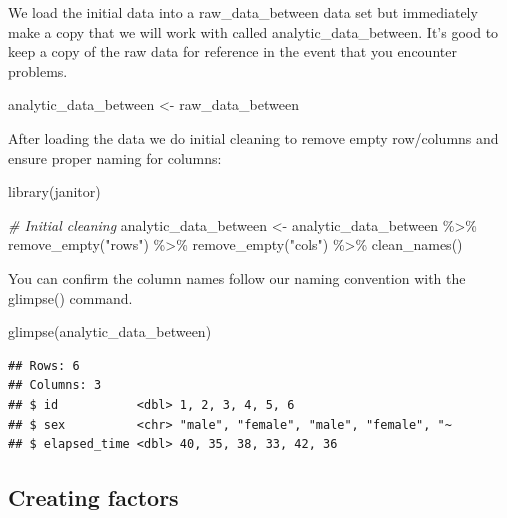 \documentclass[
]{krantz}
\makeatletter
\newenvironment{Shaded}{\begin{snugshade}}{\end{snugshade}}
\newcommand{\CommentTok}[1]{\textcolor[rgb]{0.37,0.37,0.37}{\textit{#1}}}
\newcommand{\FunctionTok}[1]{\textcolor[rgb]{0,0,0}{#1}}
\newcommand{\NormalTok}[1]{#1}
\newcommand{\OtherTok}[1]{\textcolor[rgb]{0.37,0.37,0.37}{#1}}
\newcommand{\SpecialCharTok}[1]{\textcolor[rgb]{0,0,0}{#1}}
\newcommand{\StringTok}[1]{\textcolor[rgb]{0.5,0.5,0.5}{#1}}
\newenvironment{kframe}{%
\medskip{}
\setlength{\fboxsep}{.8em}
 \def\at@end@of@kframe{}%
 \ifinner\ifhmode%
  \def\at@end@of@kframe{\end{minipage}}%
  \begin{minipage}{\columnwidth}%
 \fi\fi%
 \def\FrameCommand##1{\hskip\@totalleftmargin \hskip-\fboxsep
 \colorbox{shadecolor}{##1}\hskip-\fboxsep
     \hskip-\linewidth \hskip-\@totalleftmargin \hskip\columnwidth}%
 \MakeFramed {\advance\hsize-\width
   \@totalleftmargin\z@ \linewidth\hsize
   \@setminipage}}%
 {\par\unskip\endMakeFramed%
 \at@end@of@kframe}
\renewenvironment{Shaded}{\begin{kframe}}{\end{kframe}}
\makeatother
\begin{document}
We load the initial data into a raw\_data\_between data set but immediately make a copy that we will work with called analytic\_data\_between. It's good to keep a copy of the raw data for reference in the event that you encounter problems.

\begin{Shaded}
\begin{Highlighting}[]
\NormalTok{analytic\_data\_between }\OtherTok{\textless{}{-}}\NormalTok{ raw\_data\_between}
\end{Highlighting}
\end{Shaded}

After loading the data we do initial cleaning to remove empty row/columns and ensure proper naming for columns:

\begin{Shaded}
\begin{Highlighting}[]
\FunctionTok{library}\NormalTok{(janitor)}

\CommentTok{\# Initial cleaning}
\NormalTok{analytic\_data\_between }\OtherTok{\textless{}{-}}\NormalTok{ analytic\_data\_between }\SpecialCharTok{\%\textgreater{}\%}
  \FunctionTok{remove\_empty}\NormalTok{(}\StringTok{"rows"}\NormalTok{) }\SpecialCharTok{\%\textgreater{}\%}
  \FunctionTok{remove\_empty}\NormalTok{(}\StringTok{"cols"}\NormalTok{) }\SpecialCharTok{\%\textgreater{}\%}
  \FunctionTok{clean\_names}\NormalTok{()}
\end{Highlighting}
\end{Shaded}

You can confirm the column names follow our naming convention with the glimpse() command.

\begin{Shaded}
\begin{Highlighting}[]
\FunctionTok{glimpse}\NormalTok{(analytic\_data\_between)}
\end{Highlighting}
\end{Shaded}

\begin{verbatim}
## Rows: 6
## Columns: 3
## $ id           <dbl> 1, 2, 3, 4, 5, 6
## $ sex          <chr> "male", "female", "male", "female", "~
## $ elapsed_time <dbl> 40, 35, 38, 33, 42, 36
\end{verbatim}

\hypertarget{creating-factors-2}{%
\subsection{Creating factors}\label{creating-factors-2}}
\end{document}
